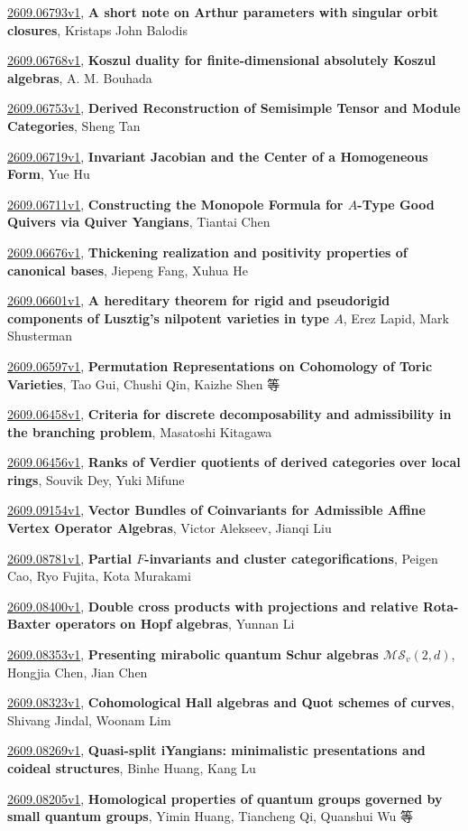 \documentclass[9pt, a4paper]{article}
\theoremstyle{plain}
\theoremstyle{definition}
\theoremstyle{remark}
\newcommand{\arxiv}[3]{\href{https://arxiv.org/abs/#1}{#1}, \textbf{\textcolor{arxivblue}{#2}}, #3}
\begin{document}
\arxiv{2609.06793v1}{A short note on Arthur parameters with singular orbit closures}{Kristaps John Balodis}

\arxiv{2609.06768v1}{Koszul duality for finite-dimensional absolutely Koszul algebras}{A. M. Bouhada}

\arxiv{2609.06753v1}{Derived Reconstruction of Semisimple Tensor and Module Categories}{Sheng Tan}

\arxiv{2609.06719v1}{Invariant Jacobian and the Center of a Homogeneous Form}{Yue Hu}

\arxiv{2609.06711v1}{Constructing the Monopole Formula for $A$-Type Good Quivers via Quiver Yangians}{Tiantai Chen}

\arxiv{2609.06676v1}{Thickening realization and positivity properties of canonical bases}{Jiepeng Fang, Xuhua He}

\arxiv{2609.06601v1}{A hereditary theorem for rigid and pseudorigid components of Lusztig's nilpotent varieties in type $A$}{Erez Lapid, Mark Shusterman}

\arxiv{2609.06597v1}{Permutation Representations on Cohomology of Toric Varieties}{Tao Gui, Chushi Qin, Kaizhe Shen 等}

\arxiv{2609.06458v1}{Criteria for discrete decomposability and admissibility in the branching problem}{Masatoshi Kitagawa}

\arxiv{2609.06456v1}{Ranks of Verdier quotients of derived categories over local rings}{Souvik Dey, Yuki Mifune}

\arxiv{2609.09154v1}{Vector Bundles of Coinvariants for Admissible Affine Vertex Operator Algebras}{Victor Alekseev, Jianqi Liu}

\arxiv{2609.08781v1}{Partial $F$-invariants and cluster categorifications}{Peigen Cao, Ryo Fujita, Kota Murakami}

\arxiv{2609.08400v1}{Double cross products with projections and relative Rota-Baxter operators on Hopf algebras}{Yunnan Li}

\arxiv{2609.08353v1}{Presenting mirabolic quantum Schur algebras $\mathcal{MS}_v(2,d)$}{Hongjia Chen, Jian Chen}

\arxiv{2609.08323v1}{Cohomological Hall algebras and Quot schemes of curves}{Shivang Jindal, Woonam Lim}

\arxiv{2609.08269v1}{Quasi-split iYangians: minimalistic presentations and coideal structures}{Binhe Huang, Kang Lu}

\arxiv{2609.08205v1}{Homological properties of quantum groups governed by small quantum groups}{Yimin Huang, Tiancheng Qi, Quanshui Wu 等}
\end{document}
